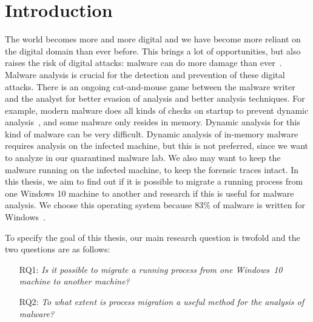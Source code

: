 \documentclass[a4paper, 11pt, english]{report}
\begin{document}
\chapter{Introduction}
\label{ch:introduction}
The world becomes more and more digital and we have become more reliant on the digital domain than ever before. This brings a lot of opportunities, but also raises the risk of digital attacks: malware can do more damage than ever~\cite{metro2023malware}.
Malware analysis is crucial for the detection and prevention of these digital attacks. There is an ongoing cat-and-mouse game between the malware writer and the analyst for better evasion of analysis and better analysis techniques.
For example, modern malware does all kinds of checks on startup to prevent dynamic analysis~\cite{al-khaser}, and some malware only resides in memory.
Dynamic analysis for this kind of malware can be very difficult.
Dynamic analysis of in-memory malware requires analysis on the infected machine, but this is not preferred, since we want to analyze in our quarantined malware lab.
We also may want to keep the malware running on the infected machine, to keep the forensic traces intact.
In this thesis, we aim to find out if it is possible to migrate a running process from one Windows 10 machine to another and research if this is useful for malware analysis. We choose this operating system because 83\% of malware is written for Windows~\cite{avtest2020report}.

To specify the goal of this thesis, our main research question is twofold and the two questions are as follows:

\begin{enumerate}[font=\textit,leftmargin=1.6cm,rightmargin=0.6cm]
	\item[RQ1:] \textit{Is it possible to migrate a running process from one Windows~10 machine to another machine?}
	\item[RQ2:] \textit{To what extent is process migration a useful method for the analysis of malware?}
\end{enumerate}
%
\end{document}
